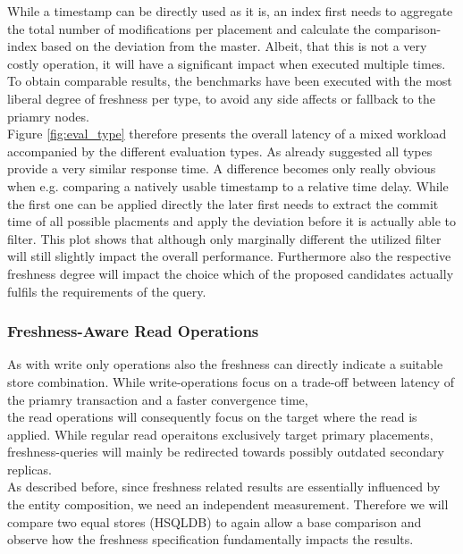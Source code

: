 While a timestamp can be directly used as it is, an index first needs to aggregate the total number of modifications per placement and 
calculate the comparison-index based on the deviation from the master.
Albeit, that this is not a very costly operation, it will have a significant impact when executed multiple times.
To obtain comparable results, the benchmarks have been executed with the most liberal degree of freshness per type, to avoid any side affects or fallback to the priamry nodes.\\
Figure \ref{fig:eval_type} therefore presents the overall latency of a mixed workload accompanied by the different evaluation types.
As already suggested all types provide a very similar response time. A difference becomes only really obvious when e.g. comparing a natively usable
timestamp to a relative time delay. While the first one can be applied directly the later first
needs to extract the commit time of all possible placments and apply the deviation before it is actually able to filter.
This plot shows that although only marginally different the utilized filter will still slightly impact the overall performance.
Furthermore also the respective freshness degree will impact the choice which of the proposed candidates actually fulfils the requirements of the query.






\subsubsection{Freshness-Aware Read Operations}

As with write only operations also the freshness can directly indicate a suitable store combination.
While write-operations focus on a trade-off between latency of the priamry transaction and a faster convergence time,\\
the read operations will consequently focus on the target where the read is applied. While regular read operaitons exclusively target
primary placements, freshness-queries will mainly be redirected towards possibly outdated secondary replicas.\\


As described before, since freshness related results are essentially influenced by the entity composition, we need an independent measurement.
Therefore we will  compare two equal stores (HSQLDB) to again allow a base comparison and observe how the freshness specification fundamentally impacts the results.\\


